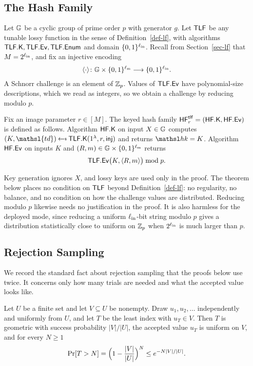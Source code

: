 \subsection{The Hash Family} \label{sec-lf-constr}

Let $\mathbb{G}$ be a cyclic group of prime order $p$ with generator $g$. Let $\mathsf{TLF}$ be
any tunable lossy function in the sense of Definition~\ref{def-lf}, with
algorithms $\mathsf{TLF}.\mathsf{K},\mathsf{TLF}.\mathsf{Ev},\mathsf{TLF}.\mathsf{Enum}$ and domain $\{0,1\}^{\ell_{\mathrm{in}}}$. Recall from
Section~\ref{sec-lf} that $M=2^{\ell_{\mathrm{in}}}$, and fix an injective encoding
$$
\langle \cdot \rangle\colon\mathbb{G}\times\{0,1\}^{\ell_{\mathrm{m}}}\longrightarrow\{0,1\}^{\ell_{\mathrm{in}}}.
$$
A Schnorr challenge is an element of $\mathbb Z_p$. Values of $\mathsf{TLF}.\mathsf{Ev}$ have
polynomial-size descriptions, which we read as integers, so we obtain a
challenge by reducing modulo $p$.

\begin{construction} \label{constr-lf}
Fix an image parameter $r\in[M]$. The keyed hash family
$\mathsf{HF}^{\mathsf{tlf}}_r=(\mathsf{HF}.\mathsf{K},\mathsf{HF}.\mathsf{Ev})$ is defined as follows. Algorithm $\mathsf{HF}.\mathsf{K}$ on
input $X\in\mathbb{G}$ computes $(K,\mathsl{td})\getsr\TLFKg(\usecp,r,\mathsf{inj})$ and
returns $\hk=K$. Algorithm $\mathsf{HF}.\mathsf{Ev}$ on inputs $K$ and
$(R,m)\in\mathbb{G}\times\{0,1\}^{\ell_{\mathrm{m}}}$ returns
$$
\mathsf{TLF}.\mathsf{Ev}\bigl(K,\langle R,m \rangle\bigr)\bmod p .
$$
\end{construction}

Key generation ignores $X$, and lossy keys are used only in the proof. The
theorem below places no condition on $\mathsf{TLF}$ beyond Definition~\ref{def-lf}: no
regularity, no balance, and no condition on how the challenge values are
distributed. Reducing modulo $p$ likewise needs no justification in the proof.
It is also harmless for the deployed mode, since reducing a uniform
$\ell_{\mathrm{in}}$-bit string modulo $p$ gives a distribution statistically close to
uniform on $\mathbb Z_p$ when $2^{\ell_{\mathrm{in}}}$ is much larger than $p$.

\subsection{Rejection Sampling} \label{sec-bk-sampling}

We record the standard fact about rejection sampling that the proofs below use
twice. It concerns only how many trials are needed and what the accepted value
looks like.

\begin{lemma} \label{lem-sim}
Let $U$ be a finite set and let $V\subseteq U$ be nonempty. Draw
$u_1,u_2,\ldots$ independently and uniformly from $U$, and let $T$ be the least
index with $u_T\in V$. Then $T$ is geometric with success probability
$|V|/|U|$, the accepted value $u_T$ is uniform on $V$, and for every $N\ge1$
$$
\Pr[T>N]=\Bigl(1-\frac{|V|}{|U|}\Bigr)^{N}\le e^{-N|V|/|U|} .
$$
\end{lemma}

